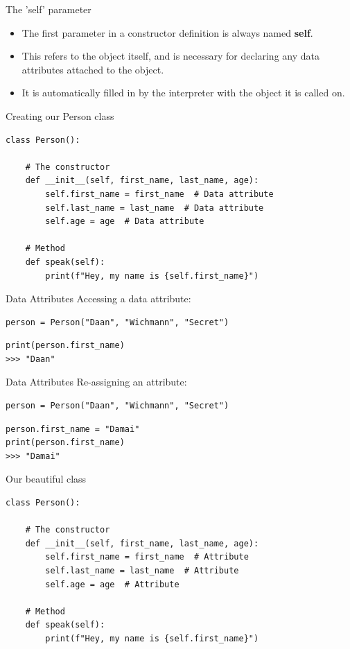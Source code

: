 \begin{frame}{The 'self' parameter}
\begin{itemize}
    \pause
    \item The first parameter in a constructor definition is always named \textbf{self}. 
    \pause
    \item This refers to the object itself, and is necessary for declaring any data attributes attached to the object.
    \pause
    \item It is automatically filled in by the interpreter with the object it is called on.
\end{itemize}
\end{frame}

\begin{frame}[fragile]{Creating our Person class}
\begin{verbatim}
class Person():
    
    # The constructor
    def __init__(self, first_name, last_name, age):
        self.first_name = first_name  # Data attribute
        self.last_name = last_name  # Data attribute
        self.age = age  # Data attribute

    # Method
    def speak(self):
        print(f"Hey, my name is {self.first_name}")
\end{verbatim}
\end{frame}

\begin{frame}[fragile]{Data Attributes}
Accessing a data attribute:
\pause
\begin{verbatim}
person = Person("Daan", "Wichmann", "Secret")
\end{verbatim}
\pause
\begin{verbatim}
print(person.first_name)
>>> "Daan"
\end{verbatim}
\end{frame}

\begin{frame}[fragile]{Data Attributes}
Re-assigning an attribute:
\pause
\begin{verbatim}
person = Person("Daan", "Wichmann", "Secret")
\end{verbatim}
\pause
\begin{verbatim}
person.first_name = "Damai"
print(person.first_name)
>>> "Damai"
\end{verbatim}
\end{frame}

\begin{frame}[fragile]{Our beautiful class}
\begin{verbatim}
class Person():
    
    # The constructor
    def __init__(self, first_name, last_name, age):
        self.first_name = first_name  # Attribute
        self.last_name = last_name  # Attribute
        self.age = age  # Attribute

    # Method
    def speak(self):
        print(f"Hey, my name is {self.first_name}")
\end{verbatim}
\end{frame}

